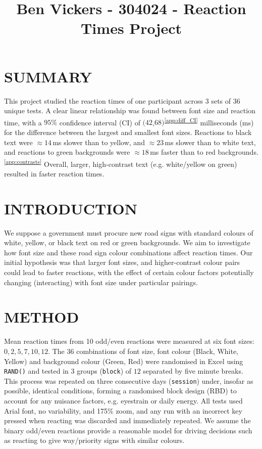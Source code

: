 \documentclass[12pt]{article}
\title{Ben Vickers - 304024 - Reaction Times Project}
\author{}
\date{}
\begin{document}
\maketitle
\section{SUMMARY}
 This project studied the reaction times of one participant across $3$ sets of $36$ unique tests. A clear linear relationship was found between font size and reaction time, with a $95\%$ confidence interval (CI) of  $(42$,$68)$\textsuperscript{\ref{app:diff_CI}} milliseconds (ms) for the difference between the largest and smallest font sizes. Reactions to black text were $\approx\!14\,$ms slower than to yellow, and $\approx\!23\,$ms slower than to white text, and reactions to green backgrounds were $\approx\!18\,$ms faster than to red backgrounds.\textsuperscript{\ref{app:contrasts}} Overall, larger, high-contrast text (e.g. white/yellow on green) resulted in faster reaction times.\newline


\vspace{-0.5cm}
\section{INTRODUCTION}

We suppose a government must procure new road signs with standard colours of white, yellow, or
black text on red or green backgrounds. We aim to investigate how font size and these road sign
colour combinations affect reaction times. Our initial hypothesis was that larger font sizes, and higher-contrast colour pairs could lead to faster reactions, with the effect of certain colour factors potentially changing (interacting) with font size under particular pairings.
\section{METHOD}


Mean reaction times from 10 odd/even reactions were measured at six font sizes:~$0,2,5,7,10,12$. The $36$ combinations of font size, font colour (Black, White, Yellow) and background colour (Green, Red)
were randomised in Excel using \texttt{RAND()} and tested in $3$ groups (\texttt{block}) of $12$ separated by five minute breaks. This process was repeated on three consecutive days (\texttt{session}) under, insofar as possible, identical conditions, forming a randomised block design (RBD) to account for any nuisance factors, e.g. eyestrain or daily energy. All tests used Arial font, no variability, and 175\% zoom, and any run with an incorrect key pressed when reacting was discarded and immediately repeated. We assume the binary odd/even reactions provide a reasonable model for driving decisions such as reacting to give way/priority signs with similar colours.\newline
\end{document}
